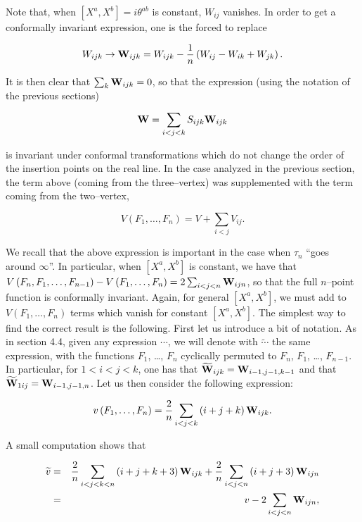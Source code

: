 \documentclass[a4paper,11pt]{article}
\newcommand{\frak}[1]{{\bf{#1}}}
\begin{document}
\noindent
Note that, when $[ X^{a},X^{b} ] =i\theta ^{ab}$ is constant, $W_{ij}$ 
vanishes. In order to get a conformally invariant expression, one
is the forced to replace 

$$
W_{ijk}\rightarrow \frak{W}_{ijk}=W_{ijk}-\frac{1}{n}\left(
W_{ij}-W_{ik}+W_{jk}\right) .
$$

\noindent
It is then clear that $\sum_{k}\frak{W}_{ijk}=0$, so that the expression 
(using the notation of the previous sections) 

$$
\frak{W}=\sum_{i<j<k}S_{ijk}\frak{W}_{ijk}
$$

\noindent
is invariant under conformal transformations which do not change the order
of the insertion points on the real line. In the case analyzed in the 
previous section, the term above (coming from the three--vertex) was 
supplemented with the term coming from the two--vertex,

$$
V\left( F_{1}, \dots, F_{n}\right) =V+\sum_{i<j}V_{ij}.
$$

\noindent
We recall that the above expression is important in the case when $\tau_{n}$
``goes around $\infty$''. In particular, when $[ X^{a},X^{b} ]$
is constant, we have that $V\left( F_{n},F_{1},\dots,F_{n-1} \right)
-V\left( F_{1},\dots,F_{n} \right) =2\sum_{i<j<n}\frak{W}_{ijn}$, so that
the full $n$--point function is conformally invariant. Again, for general 
$[ X^{a},X^{b} ]$, we must add to $V\left( F_{1},\dots,F_{n} \right) $ 
terms which vanish for constant $[ X^{a},X^{b} ]$. The simplest way to find 
the correct result is the following. First let us introduce a bit of notation. 
As in section 4.4, given any expression $\cdots$, we will denote with 
$\widetilde{\cdots}$ the same expression, with the functions $F_{1}$, \dots, 
$F_{n}$ cyclically permuted to $F_{n}$, $F_{1}$, \dots, $F_{n-1}$. In 
particular, for $1<i<j<k$, one has that 
$\widetilde{\frak{W}}_{ijk}=\frak{W}_{i-1,j-1,k-1}$ and that 
$\widetilde{\frak{W}}_{1ij}=\frak{W}_{i-1,j-1,n}$. Let us then consider the 
following expression:

$$
v\left( F_{1}, \dots, F_{n}\right) =\frac{2}{n}\sum_{i<j<k}\left(
i+j+k\right) \frak{W}_{ijk} .
$$

\noindent
A small computation shows that 

\begin{eqnarray*}
\widetilde{v} &=&\frac{2}{n}\sum_{i<j<k<n}\left( i+j+k+3\right) 
\frak{W}_{ijk}+\frac{2}{n}\sum_{i<j<n}\left( i+j+3\right) \frak{W}_{ijn} \\
&=&v-2\sum_{i<j<n}\frak{W}_{ijn},
\end{eqnarray*}
\end{document}

